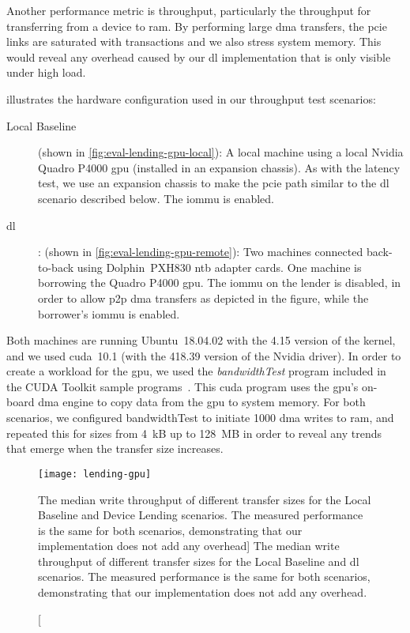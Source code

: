 Another performance metric is throughput, particularly the throughput for transferring from a device to \gls{ram}.
%
By performing large \gls{dma} transfers, the \gls{pcie} links are saturated with transactions and we also stress system memory.
%
This would reveal any overhead caused by our \gls{dl} implementation that is only visible under high load.


 illustrates the hardware configuration used in our throughput test scenarios:
\begin{description}
    \item[Local Baseline] (shown in \cref{fig:eval-lending-gpu-local}):
        A local machine using a local Nvidia Quadro P4000 \gls{gpu} (installed in an expansion chassis).
        As with the latency test, we use an expansion chassis to make the \gls{pcie} path similar to the \gls{dl} scenario described below.
        The \gls{iommu} is enabled.

    \item[\gls{dl}]: (shown in \cref{fig:eval-lending-gpu-remote}): 
        Two machines connected back-to-back using Dolphin~PXH830 \gls{ntb} adapter cards.
        One machine is borrowing the Quadro P4000 \gls{gpu}.
        The \gls{iommu} on the \gls{lender} is disabled, in order to allow \gls{p2p} \gls{dma} transfers as depicted in the figure, while the \gls{borrower}'s \gls{iommu} is enabled.
\end{description}
%
Both machines are running Ubuntu~18.04.02 with the 4.15 version of the kernel, and we used \gls{cuda}~10.1 (with the 418.39 version of the Nvidia driver).
%
In order to create a workload for the \gls{gpu}, we used the \emph{bandwidthTest} program included in the CUDA Toolkit sample programs~\cite{url:cuda}.
%
This \gls{cuda} program uses the \gls{gpu}'s on-board \gls{dma} engine to copy data from the \gls{gpu} to system memory.
%
For both scenarios, we configured bandwidthTest to initiate 1000 \gls{dma} writes to \gls{ram}, and repeated this for sizes from 4~kB up to 128~MB in order to reveal any trends that emerge when the transfer size increases.

\begin{figure}
    \centering
    \texttt{[image: lending-gpu]}
    \caption
    [The median  write throughput of different transfer sizes for the Local Baseline and Device Lending scenarios. The measured performance is the same for both scenarios, demonstrating that our implementation does not add any overhead]
    {The median  write throughput of different transfer sizes for the Local Baseline and \gls{dl} scenarios. The measured performance is the same for both scenarios, demonstrating that our implementation does not add any overhead.}
    \label{fig:eval-lending-gpu-results}
\end{figure}


